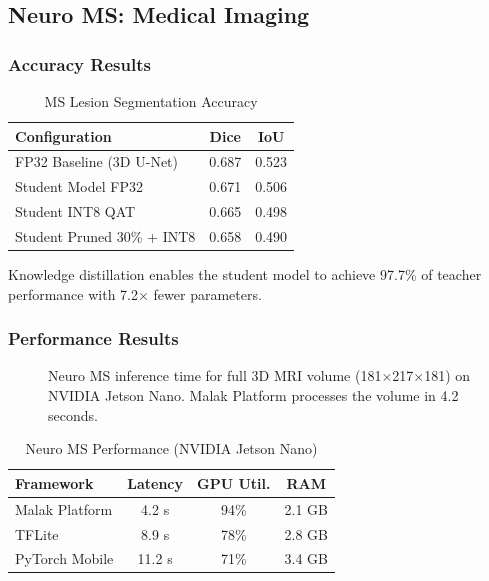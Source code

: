 \subsection{Neuro MS: Medical Imaging}

\subsubsection{Accuracy Results}

\begin{table}[h]
\centering
\caption{MS Lesion Segmentation Accuracy}
\label{tab:neuro_accuracy}
\begin{tabular}{lcc}
\hline
\textbf{Configuration} & \textbf{Dice} & \textbf{IoU} \\
\hline
FP32 Baseline (3D U-Net) & 0.687 & 0.523 \\
Student Model FP32 & 0.671 & 0.506 \\
Student INT8 QAT & 0.665 & 0.498 \\
Student Pruned 30\% + INT8 & 0.658 & 0.490 \\
\hline
\end{tabular}
\end{table}

Knowledge distillation enables the student model to achieve 97.7\% of teacher performance with 7.2$\times$ fewer parameters.

\subsubsection{Performance Results}

\begin{figure}[h]
\centering
\resizebox{0.48\textwidth}{!}{}
\caption{Neuro MS inference time for full 3D MRI volume (181$\times$217$\times$181) on NVIDIA Jetson Nano. Malak Platform processes the volume in 4.2 seconds.}
\label{fig:neuro_perf}
\end{figure}

\begin{table}[h]
\centering
\caption{Neuro MS Performance (NVIDIA Jetson Nano)}
\label{tab:neuro_perf}
\begin{tabular}{lccc}
\hline
\textbf{Framework} & \textbf{Latency} & \textbf{GPU Util.} & \textbf{RAM} \\
\hline
Malak Platform & 4.2 s & 94\% & 2.1 GB \\
TFLite & 8.9 s & 78\% & 2.8 GB \\
PyTorch Mobile & 11.2 s & 71\% & 3.4 GB \\
\hline
\end{tabular}
\end{table}

